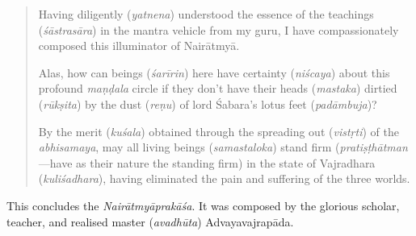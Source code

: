 \documentclass[naipra.tex]{subfiles}
\begin{document}
\begin{quote}
	Having diligently (\emph{yatnena}) understood the essence of the teachings (\emph{śāstrasāra}) in the mantra vehicle from my guru, I have compassionately composed this illuminator of Nairātmyā.

	Alas, how can beings (\emph{śarīrin}) here have certainty (\emph{niścaya}) about this profound \emph{maṇḍala} circle if they don't have their heads (\emph{mastaka}) dirtied (\emph{rūkṣita}) by the dust (\emph{reṇu}) of lord Śabara's lotus feet (\emph{padāmbuja})?

	By the merit (\emph{kuśala}) obtained through the spreading out (\emph{vistṛti}) of the \emph{abhisamaya}, may all living beings (\emph{samastaloka}) stand firm (\emph{pratiṣṭhātman}—have as their nature the standing firm) in the state of Vajradhara (\emph{kuliśadhara}), having eliminated the pain and suffering of the three worlds. 
\end{quote}

This concludes the \emph{Nairātmyāprakāśa}.
It was composed by the glorious scholar, teacher, and realised master (\emph{avadhūta}) Advayavajrapāda. 
\end{document}
